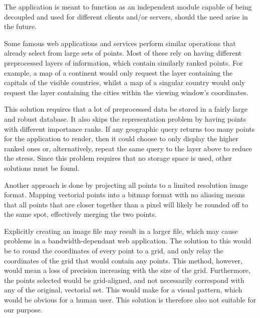 

The application is meant to function as an independent module capable of being decoupled and used for different clients and/or servers, should the need arise in the future.

Some famous web applications and services perform similar operations that already select from large sets of points. Most of these rely on having different preprocessed layers of information, which contain similarly ranked points. For example, a map of a continent would only request the layer containing the capitals of the visible countries, whilst a map of a singular country would only request the layer containing the cities within the viewing window's coordinates.

This solution requires that a lot of preprocessed data be stored in a fairly large and robust database. It also skips the representation problem by having points with different importance ranks. If any geographic query returns too many points for the application to render, then it could choose to only display the higher ranked ones or, alternatively, repeat the same query to the layer above to reduce the stress. Since this problem requires that no storage space is used, other solutions must be found.

Another approach is done by projecting all points to a limited resolution image format. Mapping vectorial points into a bitmap format with no aliasing means that all points that are closer together than a pixel will likely be rounded off to the same spot, effectively merging the two points.

Explicitly creating an image file may result in a larger file, which may cause problems in a bandwidth-dependant web application. The solution to this would be to round the coordinates of every point to a grid, and only relay the coordinates of the grid that would contain any points. This method, however, would mean a loss of precision increasing with the size of the grid. Furthermore, the points selected would be grid-aligned, and not necessarily correspond with any of the original, vectorial set. This would make for a visual pattern, which would be obvious for a human user. This solution is therefore also not suitable for our purpose.

